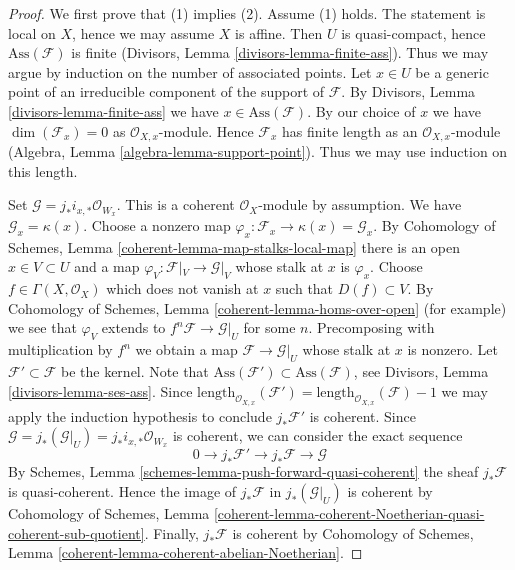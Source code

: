 \begin{proof}
We first prove that (1) implies (2). Assume (1) holds.
The statement is local on $X$, hence we may assume $X$ is affine.
Then $U$ is quasi-compact, hence $\text{Ass}(\mathcal{F})$ is finite
(Divisors, Lemma \ref{divisors-lemma-finite-ass}). Thus we may argue by
induction on the number of associated points. Let $x \in U$ be a generic
point of an irreducible component of the support of $\mathcal{F}$.
By Divisors, Lemma \ref{divisors-lemma-finite-ass} we have
$x \in \text{Ass}(\mathcal{F})$. By our choice of $x$ we have
$\dim(\mathcal{F}_x) = 0$ as $\mathcal{O}_{X, x}$-module.
Hence $\mathcal{F}_x$ has finite length as an $\mathcal{O}_{X, x}$-module
(Algebra, Lemma \ref{algebra-lemma-support-point}).
Thus we may use induction on this length.

\medskip\noindent
Set $\mathcal{G} = j_*i_{x, *}\mathcal{O}_{W_x}$. This is a coherent
$\mathcal{O}_X$-module by assumption. We have $\mathcal{G}_x = \kappa(x)$.
Choose a nonzero map
$\varphi_x : \mathcal{F}_x \to \kappa(x) = \mathcal{G}_x$.
By Cohomology of Schemes, Lemma \ref{coherent-lemma-map-stalks-local-map}
there is an open $x \in V \subset U$ and a map
$\varphi_V : \mathcal{F}|_V \to \mathcal{G}|_V$ whose stalk
at $x$ is $\varphi_x$. Choose $f \in \Gamma(X, \mathcal{O}_X)$
which does not vanish at $x$ such that $D(f) \subset V$. By
Cohomology of Schemes, Lemma \ref{coherent-lemma-homs-over-open}
(for example) we see that $\varphi_V$ extends to
$f^n\mathcal{F} \to \mathcal{G}|_U$ for some $n$.
Precomposing with multiplication by $f^n$ we obtain a map
$\mathcal{F} \to \mathcal{G}|_U$ whose stalk at $x$ is nonzero.
Let $\mathcal{F}' \subset \mathcal{F}$ be the kernel.
Note that $\text{Ass}(\mathcal{F}') \subset \text{Ass}(\mathcal{F})$, see
Divisors, Lemma \ref{divisors-lemma-ses-ass}.
Since
$\text{length}_{\mathcal{O}_{X, x}}(\mathcal{F}') = 
\text{length}_{\mathcal{O}_{X, x}}(\mathcal{F}) - 1$
we may apply the
induction hypothesis to conclude $j_*\mathcal{F}'$ is coherent.
Since $\mathcal{G} = j_*(\mathcal{G}|_U) = j_*i_{x, *}\mathcal{O}_{W_x}$
is coherent, we can consider the exact sequence
$$
0 \to j_*\mathcal{F}' \to j_*\mathcal{F} \to \mathcal{G}
$$
By Schemes, Lemma \ref{schemes-lemma-push-forward-quasi-coherent}
the sheaf $j_*\mathcal{F}$ is quasi-coherent.
Hence the image of $j_*\mathcal{F}$ in $j_*(\mathcal{G}|_U)$
is coherent by Cohomology of Schemes, Lemma
\ref{coherent-lemma-coherent-Noetherian-quasi-coherent-sub-quotient}.
Finally, $j_*\mathcal{F}$ is coherent by
Cohomology of Schemes, Lemma \ref{coherent-lemma-coherent-abelian-Noetherian}.


\end{proof}
